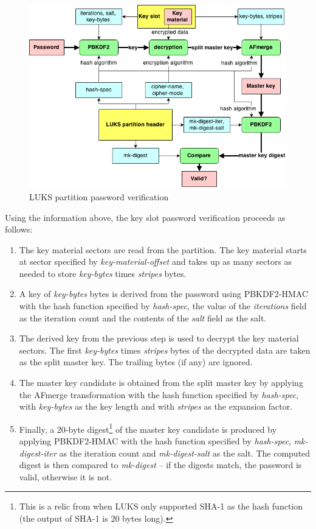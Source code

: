 \documentclass[12pt,oneside]{fithesis2}
\begin{document}
      \begin{figure}[t]
        \centering
        \includegraphics[width=\linewidth]{images/luks-pwcheck.png}
        \caption{LUKS partition password verification}
      \end{figure}
      
      Using the information above, the key slot password verification proceeds as follows:
      \begin{enumerate}
        \item The key material sectors are read from the partition. The key material starts at sector specified by \emph{key-material-offset} and takes up as many sectors as needed to store \emph{key-bytes} times \emph{stripes} bytes.
        \item A key of \emph{key-bytes} bytes is derived from the password using PBKDF2-HMAC with the hash function specified by \emph{hash-spec}, the value of the \emph{iterations} field as the iteration count and the contents of the \emph{salt} field as the salt.
        \item The derived key from the previous step is used to decrypt the key material sectors. The first \emph{key-bytes} times \emph{stripes} bytes of the decrypted data are taken as the split master key. The trailing bytes (if any) are ignored.
        \item The master key candidate is obtained from the split master key by applying the AFmerge transformation with the hash function specified by \emph{hash-spec}, with \emph{key-bytes} as the key length and with \emph{stripes} as the expansion factor.
        \item Finally, a 20-byte digest\footnote{This is a relic from when LUKS only supported SHA-1 as the hash function (the output of SHA-1 is 20 bytes long).} of the master key candidate is produced by applying PBKDF2-HMAC with the hash function specified by \emph{hash-spec}, \emph{mk-digest-iter} as the iteration count and \emph{mk-digest-salt} as the salt. The computed digest is then compared to \emph{mk-digest} -- if the digests match, the password is valid, otherwise it is not.
      \end{enumerate}
      
\end{document}
